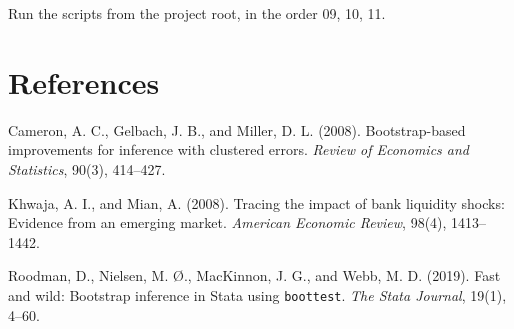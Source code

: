 \documentclass[11pt]{article}
\newcommand{\code}[1]{\texttt{#1}}
\renewcommand{\_}{\origunderscore\hspace{0pt}}  %
\begin{document}
Run the scripts from the project root, in the order 09, 10, 11.

\section*{References}

Cameron, A. C., Gelbach, J. B., and Miller, D. L. (2008). Bootstrap-based improvements for inference with clustered errors. \textit{Review of Economics and Statistics}, 90(3), 414--427.

Khwaja, A. I., and Mian, A. (2008). Tracing the impact of bank liquidity shocks: Evidence from an emerging market. \textit{American Economic Review}, 98(4), 1413--1442.

Roodman, D., Nielsen, M. {\O}., MacKinnon, J. G., and Webb, M. D. (2019). Fast and wild: Bootstrap inference in Stata using \code{boottest}. \textit{The Stata Journal}, 19(1), 4--60.
\end{document}
